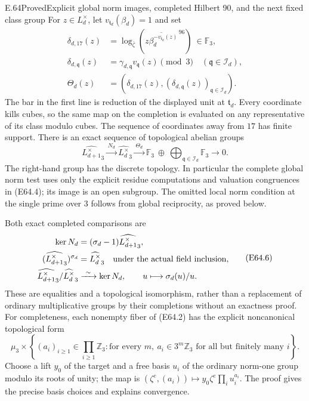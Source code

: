 \begin{statement}{E.64}{Proved}{Explicit global norm images, completed Hilbert 90, and the next fixed class group}
For $z\in L_d^\times$, let $v_{\mathfrak t_d}(\beta_d)=1$ and set
\[
 \begin{split}
 \delta_{d,17}(z)&=
  \log_{\bar\zeta}
  \left(\overline{z\beta_d^{-v_{\mathfrak t_d}(z)}}^{\,96}\right)
                         \ \in\mathbb F_3,\\
 \delta_{d,\mathfrak q}(z)&=
       \gamma_{d,\mathfrak q}v_{\mathfrak q}(z)\pmod3
                   \quad(\mathfrak q\in\mathcal I_d),\\
 \Theta_d(z)&=(\delta_{d,17}(z),
                 (\delta_{d,\mathfrak q}(z))_{\mathfrak q\in\mathcal I_d}).
 \end{split}
 \tag{E64.4}
\]
The bar in the first line is reduction of the displayed unit at
$\mathfrak t_d$. Every coordinate kills cubes, so the same map on the
completion is evaluated on any representative of its class modulo
cubes. The sequence of coordinates away from $17$ has finite support.
There is an exact sequence of topological abelian groups
\[
 \widehat{L_{d+1}^\times}_3
 \xrightarrow{\,N_d\,}\widehat{L_d^\times}_3
 \xrightarrow{\,\Theta_d\,}
 \mathbb F_3\ \oplus\
                  \bigoplus_{\mathfrak q\in\mathcal I_d}\mathbb F_3
 \longrightarrow0 .
 \tag{E64.5}
\]
The right-hand group has the discrete topology. In particular the
complete global norm test uses only the explicit residue computations
and valuation congruences in (E64.4); its image is an open subgroup.
The omitted local norm condition at the single prime over $3$ follows
from global reciprocity, as proved below.

Both exact completed comparisons are
\[
 \begin{split}
 \ker N_d&=(\sigma_d-1)\widehat{L_{d+1}^\times}_3,\\
 (\widehat{L_{d+1}^\times}_3)^{\sigma_d}
        &=\widehat{L_d^\times}_3
               \quad\hbox{under the actual field inclusion},\\
 \widehat{L_{d+1}^\times}_3/
                \widehat{L_d^\times}_3
       &\xrightarrow{\ \sim\ }\ker N_d,\qquad
          u\longmapsto\sigma_d(u)/u .
 \end{split}
 \tag{E64.6}
\]
These are equalities and a topological isomorphism, rather than a
replacement of ordinary multiplicative groups by their completions
without an exactness proof.
For completeness, each nonempty fiber of (E64.2) has the explicit
noncanonical topological form
\[
 \mu_3\times
 \left\{(a_i)_{i\ge1}\in\prod_{i\ge1}\mathbb Z_3:
       \text{for every }m,\ a_i\in3^m\mathbb Z_3
                         \text{ for all but finitely many }i\right\}.
 \tag{E64.7}
\]
Choose a lift $y_0$ of the target and a free basis $u_i$ of the ordinary
norm-one group modulo its roots of unity; the map is
$ (\zeta^e,(a_i))\mapsto
       y_0\zeta^e\prod_i u_i^{a_i}$.
The proof gives the precise basis choices and explains convergence.


\end{statement}

